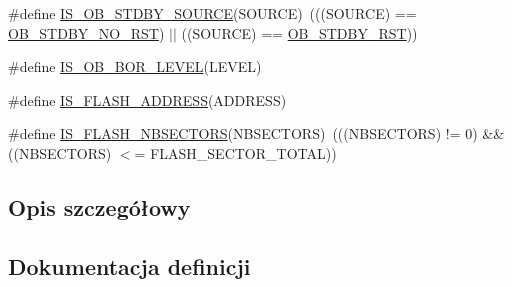 \begin{DoxyCompactItemize}
\item 
\#define \hyperlink{group___f_l_a_s_h_ex___i_s___f_l_a_s_h___definitions_ga8a05393df3a5e89551b4e2e1e8c5b884}{I\+S\+\_\+\+O\+B\+\_\+\+S\+T\+D\+B\+Y\+\_\+\+S\+O\+U\+R\+CE}(S\+O\+U\+R\+CE)~(((S\+O\+U\+R\+CE) == \hyperlink{group___f_l_a_s_h_ex___option___bytes__n_r_s_t___s_t_d_b_y_gad776ed7b3b9a98013aac9976eedb7e94}{O\+B\+\_\+\+S\+T\+D\+B\+Y\+\_\+\+N\+O\+\_\+\+R\+ST}) $\vert$$\vert$ ((S\+O\+U\+R\+CE) == \hyperlink{group___f_l_a_s_h_ex___option___bytes__n_r_s_t___s_t_d_b_y_ga69451a6f69247528f58735c9c83499ce}{O\+B\+\_\+\+S\+T\+D\+B\+Y\+\_\+\+R\+ST}))
\item 
\#define \hyperlink{group___f_l_a_s_h_ex___i_s___f_l_a_s_h___definitions_gac97ecd832fce5f4b4ff9ef7bc4493013}{I\+S\+\_\+\+O\+B\+\_\+\+B\+O\+R\+\_\+\+L\+E\+V\+EL}(L\+E\+V\+EL)
\item 
\#define \hyperlink{group___f_l_a_s_h_ex___i_s___f_l_a_s_h___definitions_gad0c8166ba15a0b8d458412a8bb74e2f0}{I\+S\+\_\+\+F\+L\+A\+S\+H\+\_\+\+A\+D\+D\+R\+E\+SS}(A\+D\+D\+R\+E\+SS)
\item 
\#define \hyperlink{group___f_l_a_s_h_ex___i_s___f_l_a_s_h___definitions_ga5b85e63e0066bf7ca518cb3790ad67e0}{I\+S\+\_\+\+F\+L\+A\+S\+H\+\_\+\+N\+B\+S\+E\+C\+T\+O\+RS}(N\+B\+S\+E\+C\+T\+O\+RS)~(((N\+B\+S\+E\+C\+T\+O\+RS) != 0) \&\& ((N\+B\+S\+E\+C\+T\+O\+RS) $<$= F\+L\+A\+S\+H\+\_\+\+S\+E\+C\+T\+O\+R\+\_\+\+T\+O\+T\+AL))
\end{DoxyCompactItemize}


\subsection{Opis szczegółowy}


\subsection{Dokumentacja definicji}
\mbox{\label{group___f_l_a_s_h_ex___i_s___f_l_a_s_h___definitions_gad0c8166ba15a0b8d458412a8bb74e2f0}} 
